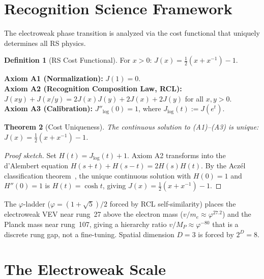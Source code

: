 \documentclass[12pt,a4paper]{article}
\newtheorem{theorem}{Theorem}[section]
\theoremstyle{definition}
\newtheorem{definition}[theorem]{Definition}
\theoremstyle{remark}
\begin{document}
\section{Recognition Science Framework}
\label{sec:framework}

The electroweak phase transition is analyzed via the cost functional
that uniquely determines all RS physics.

\begin{definition}[RS Cost Functional]
For $x > 0$: $J(x) = \tfrac{1}{2}(x + x^{-1}) - 1$.
\end{definition}

\noindent\textbf{Axiom A1 (Normalization):} $J(1) = 0$.\\
\textbf{Axiom A2 (Recognition Composition Law, RCL):}
$J(xy)+J(x/y)=2J(x)J(y)+2J(x)+2J(y)$ for all $x,y>0$.\\
\textbf{Axiom A3 (Calibration):} $J''_{\log}(0) = 1$, where
$J_{\log}(t) := J(e^t)$.

\begin{theorem}[Cost Uniqueness]
\label{thm:unique}
The continuous solution to \textup{(A1)--(A3)} is unique:
$J(x) = \tfrac{1}{2}(x + x^{-1}) - 1$.
\end{theorem}

\begin{proof}[Proof sketch]
Set $H(t) = J_{\log}(t)+1$.  Axiom A2 transforms into the d'Alembert
equation $H(s+t)+H(s-t)=2H(s)H(t)$.  By the Acz\'el classification
theorem~\cite{Aczel1966}, the unique continuous solution with $H(0)=1$
and $H''(0)=1$ is $H(t)=\cosh t$, giving
$J(x)=\tfrac{1}{2}(x+x^{-1})-1$.
\end{proof}

\noindent The $\varphi$-ladder ($\varphi=(1+\sqrt{5})/2$ forced by RCL
self-similarity) places the electroweak VEV near rung~27 above the
electron mass ($v/m_e \approx \varphi^{27.2}$) and the Planck mass
near rung~107, giving a hierarchy ratio $v/M_P \approx \varphi^{-80}$
that is a discrete rung gap, not a fine-tuning.  Spatial dimension
$D=3$ is forced by $2^D=8$.

\section{The Electroweak Scale}
\label{sec:ew-scale}
\end{document}
